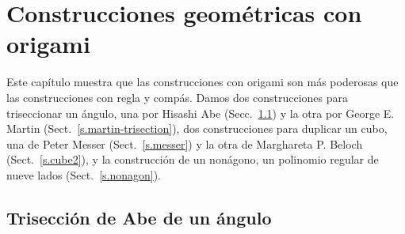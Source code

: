 
\chapter{Construcciones geométricas con origami}\label{c.origami-constructions}


Este capítulo muestra que las construcciones con origami son más poderosas que las construcciones con regla y compás. Damos dos construcciones para triseccionar un ángulo, una por Hisashi Abe (Secc.~\ref{s.abe-trisection}) y la otra por George E. Martin (Sect.~\ref{s.martin-trisection}), dos construcciones para duplicar un cubo, una de Peter Messer (Sect.~\ref{s.messer}) y la otra de Marghareta P. Beloch (Sect.~\ref{s.cube2}), y la construcción de un nonágono, un polinomio regular de nueve lados (Sect.~\ref{s.nonagon}).

\section{Trisección de Abe de un ángulo}\label{s.abe-trisection}

